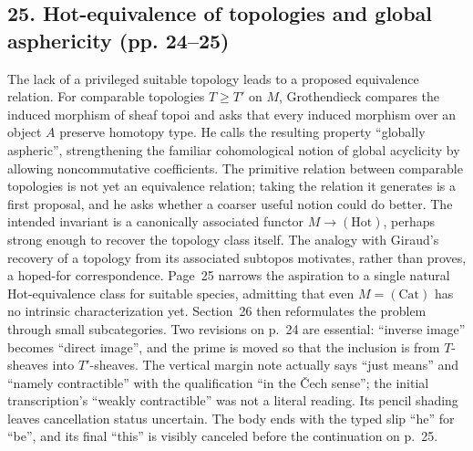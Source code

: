 \subsection*{25. Hot-equivalence of topologies and global asphericity (pp. 24--25)}
The lack of a privileged suitable topology leads to a proposed equivalence relation. For comparable topologies $T\geq T'$ on $M$, Grothendieck compares the induced morphism of sheaf topoi and asks that every induced morphism over an object $A$ preserve homotopy type. He calls the resulting property ``globally aspheric'', strengthening the familiar cohomological notion of global acyclicity by allowing noncommutative coefficients. The primitive relation between comparable topologies is not yet an equivalence relation; taking the relation it generates is a first proposal, and he asks whether a coarser useful notion could do better. The intended invariant is a canonically associated functor $M\to(\mathrm{Hot})$, perhaps strong enough to recover the topology class itself. The analogy with Giraud's recovery of a topology from its associated subtopos motivates, rather than proves, a hoped-for correspondence. Page~25 narrows the aspiration to a single natural Hot-equivalence class for suitable species, admitting that even $M=(\mathrm{Cat})$ has no intrinsic characterization yet. Section~26 then reformulates the problem through small subcategories. Two revisions on p.~24 are essential: ``inverse image'' becomes ``direct image'', and the prime is moved so that the inclusion is from $T$-sheaves into $T'$-sheaves. The vertical margin note actually says ``just means'' and ``namely contractible'' with the qualification ``in the Čech sense''; the initial transcription's ``weakly contractible'' was not a literal reading. Its pencil shading leaves cancellation status uncertain. The body ends with the typed slip ``he'' for ``be'', and its final ``this'' is visibly canceled before the continuation on p.~25.

